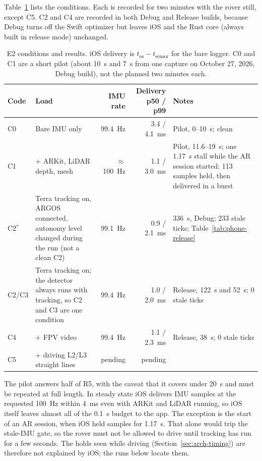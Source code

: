 Table~\ref{tab:phone-timing} lists the conditions.
Each is recorded for two minutes with the rover still, except C5.
C2 and C4 are recorded in both Debug and Release builds, because Debug turns off the Swift optimizer but leaves iOS and the Rust core (always built in release mode) unchanged.

\begin{table}[ht]
\centering
\caption{E2 conditions and results. iOS delivery is $t_{\text{os}} - t_{\text{sensor}}$ for the bare logger. C0 and C1 are a short pilot (about 10~s and 7~s from one capture on October 27, 2026, Debug build), not the planned two minutes each.}
\label{tab:phone-timing}
\small
\begin{tabularx}{\textwidth}{@{}l X r r X@{}}
\toprule
Code & Load & IMU rate & Delivery p50 / p99 & Notes \\
\midrule
C0 & Bare IMU only & 99.4~Hz & 3.4 / 4.1~ms & Pilot, 0--10~s; clean \\
C1 & + ARKit, LiDAR depth, mesh & $\approx$100~Hz & 1.1 / 3.0~ms & Pilot, 11.6--19~s; one 1.17~s stall while the AR session started: 113 samples held, then delivered in a burst \\
C2$^{*}$ & Terra tracking on, ARGOS connected, autonomy level changed during the run (not a clean C2) & 99.1~Hz & 0.9 / 2.1~ms & 336~s, Debug; 233 stale ticks; Table~\ref{tab:phone-release} \\
C2/C3 & Terra tracking on; the detector always runs with tracking, so C2 and C3 are one condition & 99.4~Hz & 1.0 / 2.0~ms & Release, 122~s and 52~s; 0 stale ticks \\
C4 & + FPV video & 99.4~Hz & 1.1 / 2.3~ms & Release, 38~s; 0 stale ticks \\
C5 & + driving L2/L3 straight lines & pending & pending & \\
\bottomrule
\end{tabularx}
\end{table}

The pilot answers half of R5, with the caveat that it covers under 20~s and must be repeated at full length.
In steady state iOS delivers IMU samples at the requested 100~Hz within 4~ms even with ARKit and LiDAR running, so iOS itself leaves almost all of the 0.1~s budget to the app.
The exception is the start of an AR session, when iOS held samples for 1.17~s.
That alone would trip the stale-IMU gate, so the rover must not be allowed to drive until tracking has run for a few seconds.
The holds seen while driving (Section~\ref{sec:arch-timing}) are therefore not explained by iOS; the runs below locate them.


